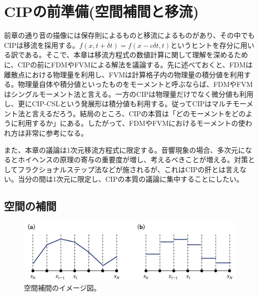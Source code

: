 \documentclass[dvipdfmx, 9pt, a4paper]{jsarticle}
\begin{document}
\section{CIPの前準備(空間補間と移流)}
前章の通り音の描像には保存則によるものと移流によるものがあり、その中でもCIPは移流を採用する。$f(x, t+\delta t)=f(x-c\delta t, t)$というヒントを存分に用いる訳である。そこで、本章は移流方程式の数値計算に関して理解を深めるために、CIPの前にFDMやFVMによる解法を議論する。先に述べておくと、FDMは離散点における物理量を利用し、FVMは計算格子内の物理量の積分値を利用する。物理量自体や積分値といったものをモーメントと呼ぶならば、FDMやFVMはシングルモーメント法と言える。一方のCIPは物理量だけでなく微分値も利用し、更にCIP-CSLという発展形は積分値も利用する。従ってCIPはマルチモーメント法と言えるだろう。結局のところ、CIPの本質は「どのモーメントをどのように利用するか」にある。したがって、FDMやFVMにおけるモーメントの使われ方は非常に参考になる。\par
また、本章の議論は1次元移流方程式に限定する。音響現象の場合、多次元になるとホイヘンスの原理の寄与の重要度が増し、考えるべきことが増える。対策としてフラクショナルステップ法などが施されるが、これはCIPの肝とは言えない。当分の間は1次元に限定し、CIPの本質の議論に集中することにしたい。

\subsection{空間の補間}

\begin{figure}[b]
\begin{center}
\includegraphics[width=12cm]{"fig1.png"}
\caption{空間補間のイメージ図。}
\end{center}
\end{figure}
\end{document}
